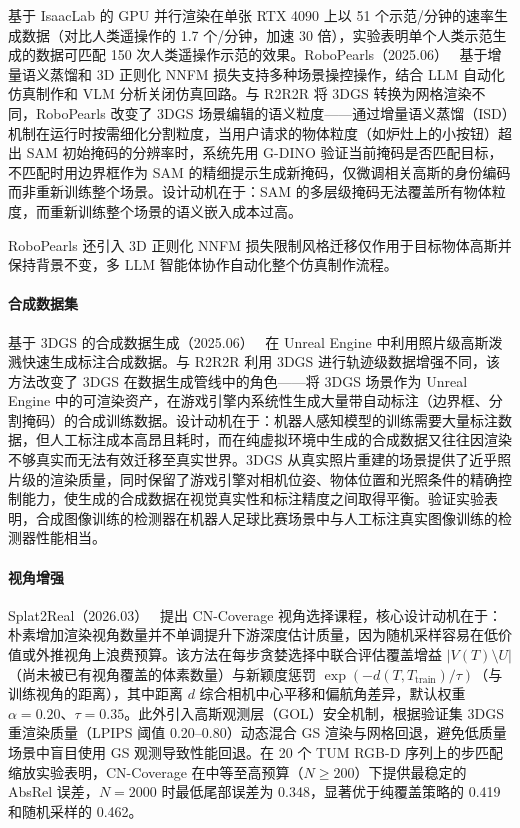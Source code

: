 基于 IsaacLab 的 GPU 并行渲染在单张 RTX 4090 上以 51 个示范/分钟的速率生成数据（对比人类遥操作的 1.7 个/分钟，加速 30 倍），实验表明单个人类示范生成的数据可匹配 150 次人类遥操作示范的效果。RoboPearls（2025.06）~\cite{2506_22756} 基于增量语义蒸馏和 3D 正则化 NNFM 损失支持多种场景操控操作，结合 LLM 自动化仿真制作和 VLM 分析关闭仿真回路。与 R2R2R 将 3DGS 转换为网格渲染不同，RoboPearls 改变了 3DGS 场景编辑的语义粒度——通过增量语义蒸馏（ISD）机制在运行时按需细化分割粒度，当用户请求的物体粒度（如炉灶上的小按钮）超出 SAM 初始掩码的分辨率时，系统先用 G-DINO 验证当前掩码是否匹配目标，不匹配时用边界框作为 SAM 的精细提示生成新掩码，仅微调相关高斯的身份编码而非重新训练整个场景。设计动机在于：SAM 的多层级掩码无法覆盖所有物体粒度，而重新训练整个场景的语义嵌入成本过高。

RoboPearls 还引入 3D 正则化 NNFM 损失限制风格迁移仅作用于目标物体高斯并保持背景不变，多 LLM 智能体协作自动化整个仿真制作流程。

\paragraph{合成数据集}

基于 3DGS 的合成数据生成（2025.06）~\cite{2506_05092} 在 Unreal Engine 中利用照片级高斯泼溅快速生成标注合成数据。与 R2R2R 利用 3DGS 进行轨迹级数据增强不同，该方法改变了 3DGS 在数据生成管线中的角色——将 3DGS 场景作为 Unreal Engine 中的可渲染资产，在游戏引擎内系统性生成大量带自动标注（边界框、分割掩码）的合成训练数据。设计动机在于：机器人感知模型的训练需要大量标注数据，但人工标注成本高昂且耗时，而在纯虚拟环境中生成的合成数据又往往因渲染不够真实而无法有效迁移至真实世界。3DGS 从真实照片重建的场景提供了近乎照片级的渲染质量，同时保留了游戏引擎对相机位姿、物体位置和光照条件的精确控制能力，使生成的合成数据在视觉真实性和标注精度之间取得平衡。验证实验表明，合成图像训练的检测器在机器人足球比赛场景中与人工标注真实图像训练的检测器性能相当。

\paragraph{视角增强}

Splat2Real（2026.03）~\cite{2603_10638} 提出 CN-Coverage 视角选择课程，核心设计动机在于：朴素增加渲染视角数量并不单调提升下游深度估计质量，因为随机采样容易在低价值或外推视角上浪费预算。该方法在每步贪婪选择中联合评估覆盖增益 $|V(T) \setminus U|$（尚未被已有视角覆盖的体素数量）与新颖度惩罚 $\exp(-d(T, T_\text{train})/\tau)$（与训练视角的距离），其中距离 $d$ 综合相机中心平移和偏航角差异，默认权重 $\alpha=0.20$、$\tau=0.35$。此外引入高斯观测层（GOL）安全机制，根据验证集 3DGS 重渲染质量（LPIPS 阈值 0.20–0.80）动态混合 GS 渲染与网格回退，避免低质量场景中盲目使用 GS 观测导致性能回退。在 20 个 TUM RGB-D 序列上的步匹配缩放实验表明，CN-Coverage 在中等至高预算（$N \geq 200$）下提供最稳定的 AbsRel 误差，$N=2000$ 时最低尾部误差为 0.348，显著优于纯覆盖策略的 0.419 和随机采样的 0.462。

